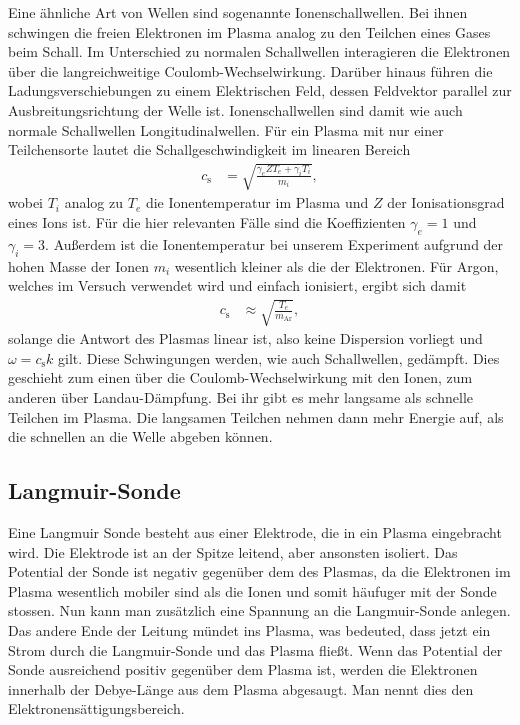 Eine \"ahnliche Art von Wellen sind sogenannte Ionenschallwellen.
Bei ihnen schwingen die freien Elektronen im Plasma analog zu den Teilchen eines Gases beim Schall.
Im Unterschied zu normalen Schallwellen interagieren die Elektronen \"uber die langreichweitige Coulomb-Wechselwirkung.
Dar\"uber hinaus f\"uhren die Ladungsverschiebungen zu einem Elektrischen Feld, dessen Feldvektor parallel zur Ausbreitungsrichtung der Welle ist.
Ionenschallwellen sind damit wie auch normale Schallwellen Longitudinalwellen.
\cite{schwabedissen99a}
F\"ur ein Plasma mit nur einer Teilchensorte lautet die Schallgeschwindigkeit im linearen Bereich
\begin{align}
c_\text{s}
    &=\sqrt{\frac{\gamma_eZT_e+\gamma_iT_i}{m_i}},
    \label{eq:cs1}
\end{align}
wobei $T_i$ analog zu $T_e$ die Ionentemperatur im Plasma und $Z$ der Ionisationsgrad eines Ions ist.
F\"ur die hier relevanten F\"alle sind die Koeffizienten $\gamma_e=1$ und $\gamma_i=3$.
Au\ss erdem ist die Ionentemperatur bei unserem Experiment aufgrund der hohen Masse der Ionen $m_i$ wesentlich kleiner als die der Elektronen.
F\"ur Argon, welches im Versuch verwendet wird und einfach ionisiert, ergibt sich damit
\begin{align}
c_\text{s}
    &\approx\sqrt{\frac{T_e}{m_\text{Ar}}},
    \label{eq:cs2}
\end{align}
solange die Antwort des Plasmas linear ist, also keine Dispersion vorliegt und $\omega=c_\text{s}k$ gilt.
Diese Schwingungen werden, wie auch Schallwellen, ged\"ampft.
Dies geschieht zum einen \"uber die Coulomb-Wechselwirkung mit den Ionen, zum anderen \"uber Landau-D\"ampfung.
\cite{wiki:IAwaves}
Bei ihr gibt es mehr langsame als schnelle Teilchen im Plasma.
Die langsamen Teilchen nehmen dann mehr Energie auf, als die schnellen an die Welle abgeben k\"onnen.
\cite{wiki:Landau}

\subsection{Langmuir-Sonde}
Eine Langmuir Sonde besteht aus einer Elektrode, die in ein Plasma eingebracht wird.
Die Elektrode ist an der Spitze leitend, aber ansonsten isoliert.
Das Potential der Sonde ist negativ gegen\"uber dem des Plasmas, da die Elektronen im Plasma wesentlich mobiler sind als die Ionen und somit h\"aufuger mit der Sonde stossen.
Nun kann man zus\"atzlich eine Spannung an die Langmuir-Sonde anlegen.
Das andere Ende der Leitung m\"undet ins Plasma, was bedeuted, dass jetzt ein Strom durch die Langmuir-Sonde und das Plasma flie\ss t.
Wenn das Potential der Sonde ausreichend positiv gegen\"uber dem Plasma ist, werden die Elektronen innerhalb der Debye-L\"ange aus dem Plasma abgesaugt.
Man nennt dies den Elektronens\"attigungsbereich.
\cite{anleitung1}

